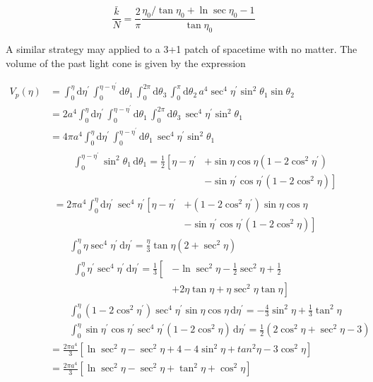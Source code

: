 \documentclass[preprint,notitlepage,amsmath,amssymb,floatfix]{revtex4-1}
\begin{document}
\begin{equation}
\label{eq:trans1}
\frac{\bar k}{N} = \frac{2}{\pi}\frac{\eta_0 / \tan\eta_0 + \ln\sec\eta_0 - 1}{\tan\eta_0}
\end{equation}

\noindent A similar strategy may applied to a 3+1 patch of spacetime with no matter.  The volume of the past light cone is given by the expression

\begin{align}
V_p\left(\eta\right) &= \int_0^\eta \! \mathrm d\eta^\prime \, \int_0^{\eta-\eta^\prime} \! \mathrm d\theta_1 \, \int_0^{2\pi}\!\mathrm d\theta_3\, \int_0^\pi\!\mathrm d\theta_2\, a^4\sec^4\eta^\prime\sin^2\theta_1\sin\theta_2 \\
  &= 2a^4\int_0^\eta\!\mathrm d\eta^\prime\, \int_0^{\eta-\eta^\prime}\!\mathrm d\theta_1\, \int_0^{2\pi}\!\mathrm d\theta_3\, \sec^4\eta^\prime\sin^2\theta_1 \\
  &= 4\pi a^4 \int_0^\eta\!\mathrm d\eta^\prime\,\int_0^{\eta-\eta^\prime}\!\mathrm d\theta_1\, \sec^4\eta^\prime\sin^2\theta_1 \\
  &\qquad\begin{aligned}
    \int_0^{\eta-\eta^\prime}\!\sin^2\theta_1\,\mathrm d\theta_1 = \frac{1}{2}\left[\eta-\eta^\prime\right.&\left.+\sin\eta\cos\eta\left(1-2\cos^2\eta^\prime\right)\right. \\
    &\left.-\sin\eta^\prime\cos\eta^\prime\left(1-2\cos^2\eta\right)\right]
  \end{aligned} \\
  &\begin{aligned}
    = 2\pi a^4\int_0^\eta\!\mathrm d\eta^\prime\,\sec^4\eta^\prime\left[\eta-\eta^\prime\right.&\left.+\left(1-2\cos^2\eta^\prime\right)\sin\eta\cos\eta\right. \\
    &\left.-\sin\eta^\prime\cos\eta^\prime\left(1-2\cos^2\eta\right)\right]
  \end{aligned} \\
  &\qquad\int_0^\eta\!\eta\sec^4\eta^\prime\,\mathrm d\eta^\prime = \frac{\eta}{3}\tan\eta\left(2+\sec^2\eta\right) \\
  &\qquad\begin{aligned}
    \int_0^\eta\!\eta^\prime\sec^4\eta^\prime\,\mathrm d\eta^\prime = \frac{1}{3}\left[\right.&\left.-\ln\sec^2\eta-\frac{1}{2}\sec^2\eta + \frac{1}{2}\right. \\
    &\left.+2\eta\tan\eta+\eta\sec^2\eta\tan\eta\right]
  \end{aligned} \\
  &\qquad\int_0^\eta\!\left(1-2\cos^2\eta^\prime\right)\sec^4\eta^\prime\sin\eta\cos\eta\,\mathrm d\eta^\prime = -\frac{4}{3}\sin^2\eta+\frac{1}{3}\tan^2\eta \\
  &\qquad\int_0^\eta\!\sin\eta^\prime\cos\eta^\prime\sec^4\eta^\prime\left(1-2\cos^2\eta\right)\,\mathrm d\eta^\prime = \frac{1}{2}\left(2\cos^2\eta+\sec^2\eta-3\right) \\
  &= \frac{2\pi a^4}{3}\left[\ln\sec^2\eta-\sec^2\eta+4-4\sin^2\eta+tan^2\eta-3\cos^2\eta\right] \\
  &= \frac{2\pi a^4}{3}\left[\ln\sec^2\eta-\sec^2\eta+\tan^2\eta+\cos^2\eta\right]
\end{align}
\end{document}
